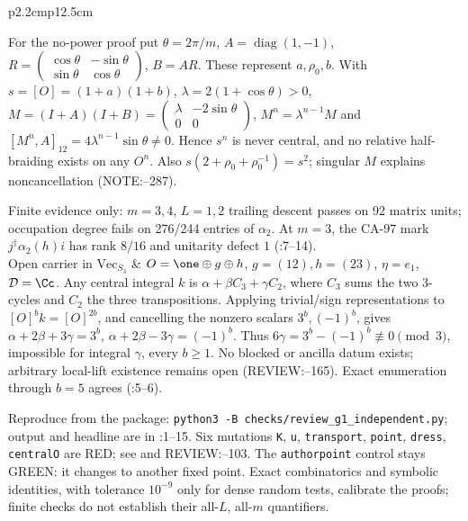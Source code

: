 \begin{center}
\begin{tabular}{p{2.2cm}p{12.5cm}}
\par For the no-power proof put \(\theta=2\pi/m\), \(A=\operatorname{diag}(1,-1)\),
\(R=\left(\begin{smallmatrix}\cos\theta&-\sin\theta\\\sin\theta&\cos\theta\end{smallmatrix}\right)\), \(B=AR\).
These represent \(a,\rho_0,b\). With \(s=[O]=(1+a)(1+b)\), \(\lambda=2(1+\cos\theta)>0\),
\(M=(I+A)(I+B)=\left(\begin{smallmatrix}\lambda&-2\sin\theta\\0&0\end{smallmatrix}\right)\),
\(M^n=\lambda^{n-1}M\) and \([M^n,A]_{12}=4\lambda^{n-1}\sin\theta\ne0\).
Hence \(s^n\) is never central, and no relative half-braiding exists on any \(O^n\).
Also \(s(2+\rho_0+\rho_0^{-1})=s^2\); singular \(M\) explains noncancellation (NOTE:--287).
\par Finite evidence only: \(m=3,4\), \(L=1,2\) trailing descent passes on 92 matrix units;
occupation degree fails on 276/244 entries of \(\alpha_2\). At \(m=3\), the CA-97 mark
\(j^\dagger\alpha_2(h)i\) has rank \(8/16\) and unitarity defect \(1\)
(:7--14). \\
\midrule
Open carrier in \(\mathrm{Vec}_{S_3}\) &
\(O=\one\oplus g\oplus h\), \(g=(12),h=(23)\), \(\eta=e_1\), \(\mathcal D=\Cc\).
Any central integral \(k\) is \(\alpha+\beta C_3+\gamma C_2\), where \(C_3\) sums the two 3-cycles and \(C_2\) the three transpositions.
Applying trivial/sign representations to \([O]^b k=[O]^{2b}\), and cancelling the nonzero scalars \(3^b,(-1)^b\), gives
\(\alpha+2\beta+3\gamma=3^b\), \(\alpha+2\beta-3\gamma=(-1)^b\).
Thus \(6\gamma=3^b-(-1)^b\not\equiv0\pmod3\), impossible for integral \(\gamma\), every \(b\ge1\).
No blocked or ancilla datum exists; arbitrary local-lift existence remains open (REVIEW:--165).
Exact enumeration through \(b=5\) agrees (:5--6). \\
\bottomrule
\end{tabular}\end{center}
Reproduce from the package: \texttt{python3 -B checks/review\_g1\_independent.py}; output and headline are in
:1--15. Six mutations \texttt{K}, \texttt{u}, \texttt{transport}, \texttt{point}, \texttt{dress}, \texttt{centralO}
are RED; see  and REVIEW:--103. The \texttt{authorpoint} control stays GREEN:
it changes to another fixed point. Exact combinatorics and symbolic identities, with tolerance \(10^{-9}\) only for
dense random tests, calibrate the proofs; finite checks do not establish their all-\(L\), all-\(m\) quantifiers.

